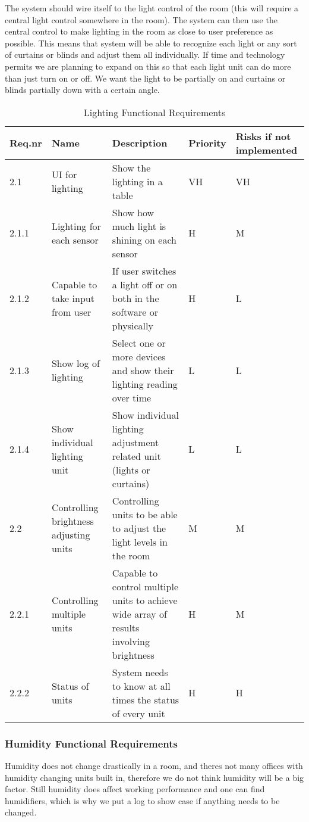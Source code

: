 \documentclass[../document]{subfiles}
\begin{document}
The system should wire itself to the light control of the room (this will require a central light control somewhere in the room). The system can then use the central control to make lighting in the room as close to user preference as possible. This means that system will be able to recognize each light or any sort of curtains or blinds and adjust them all individually. If time and technology permits we are planning to expand on this so that each light unit can do more than just turn on or off. We want the light to be partially on and curtains or blinds partially down with a certain angle.


\begin{table}[H]
\caption{Lighting Functional Requirements}
\centering
\begin{tabularx}{\textwidth}{|l|X|X|l|X|}
	\hline
	Req.nr
	&Name
	&Description
	&Priority
	&Risks if not implemented
	\\ \hline 2.1
	&UI for lighting
	&Show the lighting in a table
	&VH
	&VH
	\\ \hline 2.1.1
	&Lighting for each sensor
	&Show how much light is shining on each sensor
	&H
	&M
	\\ \hline 2.1.2
	&Capable to take input from user
	&If user switches a light off or on both in the software or physically
	&H
	&L
	\\ \hline 2.1.3
	&Show log of lighting
	&Select one or more devices and show their lighting reading over time
	&L
	&L
	\\ \hline 2.1.4
	&Show individual lighting unit
	&Show individual lighting adjustment related unit (lights or curtains)
	&L
	&L
	\\ \hline 2.2
	&Controlling brightness adjusting units
	&Controlling units to be able to adjust the light levels in the room
	&M
	&M
	\\ \hline 2.2.1
	&Controlling multiple units
	&Capable to control multiple units to achieve wide array of results involving brightness 
	&H
	&M
	\\ \hline 2.2.2
	&Status of units
	&System needs to know at all times the status of every unit
	&H
	&H
	\\ \hline 
\end{tabularx}
\end{table}

\subsubsection{Humidity Functional Requirements}
Humidity does not change drastically in a room, and theres not many offices with humidity changing units built in, therefore we do not think humidity will be a big factor. Still humidity does affect working performance and one can find humidifiers, which is why we put a log to show case if anything needs to be changed. 
\end{document}
